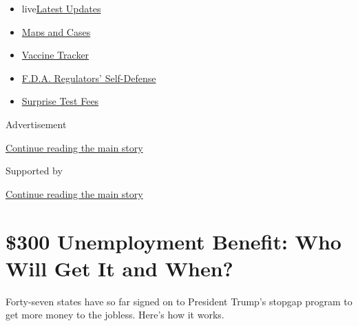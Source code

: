 \begin{itemize}
\tightlist
\item
  live\href{https://www.nytimes3xbfgragh.onion/2020/09/11/world/covid-19-coronavirus.html?name=styln-coronavirus-markets\&region=TOP_BANNER\&block=storyline_menu_recirc\&action=click\&pgtype=Article\&impression_id=411548b1-f4c5-11ea-b924-e5b48aa72b34\&variant=undefined}{Latest
  Updates}
\item
  \href{https://www.nytimes3xbfgragh.onion/interactive/2020/us/coronavirus-us-cases.html?name=styln-coronavirus-markets\&region=TOP_BANNER\&block=storyline_menu_recirc\&action=click\&pgtype=Article\&impression_id=411548b2-f4c5-11ea-b924-e5b48aa72b34\&variant=undefined}{Maps
  and Cases}
\item
  \href{https://www.nytimes3xbfgragh.onion/interactive/2020/science/coronavirus-vaccine-tracker.html?name=styln-coronavirus-markets\&region=TOP_BANNER\&block=storyline_menu_recirc\&action=click\&pgtype=Article\&impression_id=411548b3-f4c5-11ea-b924-e5b48aa72b34\&variant=undefined}{Vaccine
  Tracker}
\item
  \href{https://www.nytimes3xbfgragh.onion/2020/09/10/us/politics/fda-coronavirus-vaccine.html?name=styln-coronavirus-markets\&region=TOP_BANNER\&block=storyline_menu_recirc\&action=click\&pgtype=Article\&impression_id=411548b4-f4c5-11ea-b924-e5b48aa72b34\&variant=undefined}{F.D.A.
  Regulators' Self-Defense}
\item
  \href{https://www.nytimes3xbfgragh.onion/2020/09/09/upshot/coronavirus-surprise-test-fees.html?name=styln-coronavirus-markets\&region=TOP_BANNER\&block=storyline_menu_recirc\&action=click\&pgtype=Article\&impression_id=411548b5-f4c5-11ea-b924-e5b48aa72b34\&variant=undefined}{Surprise
  Test Fees}
\end{itemize}

Advertisement

\protect\hyperlink{after-top}{Continue reading the main story}

Supported by

\protect\hyperlink{after-sponsor}{Continue reading the main story}

\hypertarget{300-unemployment-benefit-who-will-get-it-and-when}{%
\section{\$300 Unemployment Benefit: Who Will Get It and
When?}\label{300-unemployment-benefit-who-will-get-it-and-when}}

Forty-seven states have so far signed on to President Trump's stopgap
program to get more money to the jobless. Here's how it works.

